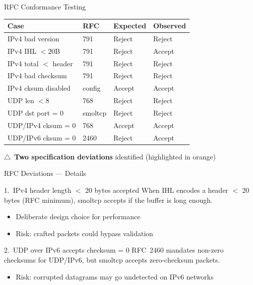 \documentclass[aspectratio=169,11pt]{beamer}
\begin{document}
\begin{frame}{RFC Conformance Testing}
\centering
\small
\begin{tabular}{p{4.2cm}lll}
\toprule
\textbf{Case} & \textbf{RFC} & \textbf{Expected} & \textbf{Observed} \\
\midrule
IPv4 bad version & 791 & Reject & Reject \\
IPv4 IHL $< 20$B & 791 & Reject & \textcolor{warnorange}{Accept} \\
IPv4 total $<$ header & 791 & Reject & Reject \\
IPv4 bad checksum & 791 & Reject & Reject \\
IPv4 cksum disabled & config & Accept & Accept \\
UDP len $< 8$ & 768 & Reject & Reject \\
UDP dst port = 0 & smoltcp & Reject & Reject \\
UDP/IPv4 cksum = 0 & 768 & Accept & Accept \\
UDP/IPv6 cksum = 0 & 2460 & Reject & \textcolor{warnorange}{Accept} \\
\bottomrule
\end{tabular}
\vspace{0.3cm}

\textcolor{warnorange}{$\triangle$}~\textbf{Two specification deviations} identified (highlighted in orange)
\end{frame}

\begin{frame}{RFC Deviations --- Details}
\begin{block}{1.~IPv4 header length $<$ 20 bytes accepted}
When IHL encodes a header $<$ 20 bytes (RFC minimum), smoltcp accepts if the buffer is long enough.
\begin{itemize}\small
  \item Deliberate design choice for performance
  \item Risk: crafted packets could bypass validation
\end{itemize}
\end{block}
\vspace{0.3cm}
\begin{block}{2.~UDP over IPv6 accepts checksum = 0}
RFC~2460 mandates non-zero checksums for UDP/IPv6, but smoltcp accepts zero-checksum packets.
\begin{itemize}\small
  \item Risk: corrupted datagrams may go undetected on IPv6 networks
\end{itemize}
\end{block}
\end{frame}
\end{document}

